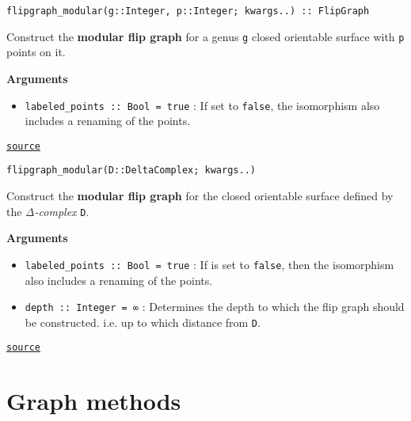 \begin{adjustwidth}{2em}{0pt}


\begin{verbatim}
flipgraph_modular(g::Integer, p::Integer; kwargs..) :: FlipGraph
\end{verbatim}

Construct the \textbf{modular flip graph} for a genus \texttt{g} closed orientable surface with \texttt{p} points on it.  

\textbf{Arguments}

\begin{itemize}
\item \texttt{labeled\_points :: Bool = true} : If set to \texttt{false}, the isomorphism also includes a renaming of the points. 

\end{itemize}


\href{https://github.com/schto223/FlipGraphs.jl/blob/e35d43698a06b86273148826b79d585ba04fcd26/src/flipGraph.jl#L284-L291}{\texttt{source}}



\begin{verbatim}
flipgraph_modular(D::DeltaComplex; kwargs..)
\end{verbatim}

Construct the \textbf{modular flip graph} for the closed orientable surface defined by the \emph{Δ-complex} \texttt{D}.  

\textbf{Arguments}

\begin{itemize}
\item \texttt{labeled\_points :: Bool = true} : If is set to \texttt{false}, then the isomorphism also includes a renaming of the points. 


\item \texttt{depth :: Integer = ∞} : Determines the depth to which the flip graph should be constructed. i.e. up to which distance from \texttt{D}. 

\end{itemize}


\href{https://github.com/schto223/FlipGraphs.jl/blob/e35d43698a06b86273148826b79d585ba04fcd26/src/flipGraph.jl#L296-L304}{\texttt{source}}


\end{adjustwidth}

\section{Graph methods}



